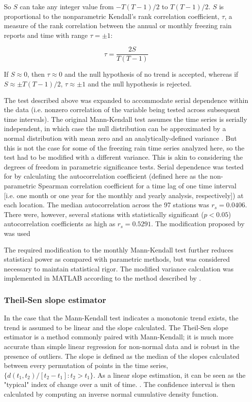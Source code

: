 \documentclass[twocol]{ametsoc}
\begin{document}
So $S$ can take any integer value from $-T(T-1)/2$ to $T(T-1)/2$. $S$ is proportional to the nonparametric Kendall's rank correlation coefficient, $\tau$, a measure of the rank correlation between the annual or monthly freezing rain reports and time with range $\tau=\pm1$:

\[\tau=\frac{2S}{T(T-1)}\]

If $S\approx0$, then $\tau\approx0$ and the null hypothesis of no trend is accepted, whereas if  $S\approx\pm T(T-1)/2$, $\tau\approx\pm1$ and the null hypothesis is rejected. 

The test described above was expanded to accommodate serial dependence within the data (i.e. nonzero correlation of the variable being tested across subsequent time intervals). The original Mann-Kendall test assumes the time series is serially independent, in which case the null distribution can be approximated by a normal distribution with mean zero and an analytically-defined variance \citep{kendall1955rank}. But this is not the case for some of the freezing rain time series analyzed here, so the test had to be modified with a different variance. This is akin to considering the degrees of freedom in parametric significance tests. Serial dependence was tested for by calculating the autocorrelation coefficient (defined here as the non-parametric Spearman correlation coefficient for a time lag of one time interval [i.e. one month or one year for the monthly and yearly analysis, respectively]) at each location. The median autocorrelation across the 97 stations was $r_s = 0.0406$. There were, however, several stations with statistically significant ($p<0.05$) autocorrelation coefficients as high as $r_s = 0.5291$. The modification proposed by \citet{hamed1998modified} was used

The required modification to the monthly Mann-Kendall test further reduces statistical power as compared with parametric methods, but was considered necessary to maintain statistical rigor. The modified variance calculation was implemented in MATLAB according to the method described by \citet{hirsch1984nonparametric}.


\subsubsection{Theil-Sen slope estimator}
In the case that the Mann-Kendall test indicates a monotonic trend exists, the trend is assumed to be linear and the slope calculated. The Theil-Sen slope estimator is a method commonly paired with Mann-Kendall; it is much more accurate than simple linear regression for non-normal data and is robust in the presence of outliers. The slope is defined as the median of the slopes calculated between every permutation of points in the time series, $\{d(t_1,t_2)/[t_2-t_1]:t_2>t_1\}$. As a linear slope estimation, it can be seen as the "typical" index of change over a unit of time. \citep{chandler2011statistical}. The confidence interval is then calculated by computing an inverse normal cumulative density function.
\end{document}
